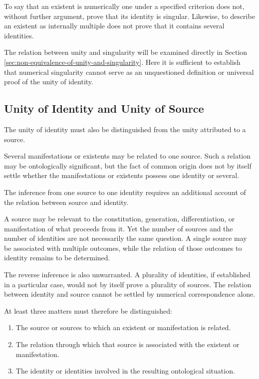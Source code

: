 To say that an existent is numerically one under
a specified criterion does not, without further
argument, prove that its identity is singular.
Likewise, to describe an existent as internally
multiple does not prove that it contains several
identities.

The relation between unity and singularity will
be examined directly in Section
\ref{sec:non-equivalence-of-unity-and-singularity}.
Here it is sufficient to establish that numerical
singularity cannot serve as an unquestioned definition
or universal proof of the unity of identity.

\subsection{Unity of Identity and Unity of Source}

The unity of identity must also be distinguished
from the unity attributed to a source.

Several manifestations or existents may be related
to one source. Such a relation may be ontologically
significant, but the fact of common origin does
not by itself settle whether the manifestations
or existents possess one identity or several.

The inference from one source to one identity
requires an additional account of the relation
between source and identity.

A source may be relevant to the constitution,
generation, differentiation, or manifestation
of what proceeds from it. Yet the number of sources
and the number of identities are not necessarily
the same question. A single source may be associated
with multiple outcomes, while the relation of those
outcomes to identity remains to be determined.

The reverse inference is also unwarranted. A plurality
of identities, if established in a particular case,
would not by itself prove a plurality of sources.
The relation between identity and source cannot
be settled by numerical correspondence alone.

At least three matters must therefore be distinguished:

\begin{enumerate}
    \item The source or sources to which an existent
    or manifestation is related.

    \item The relation through which that source
    is associated with the existent or manifestation.

    \item The identity or identities involved in
    the resulting ontological situation.
\end{enumerate}

